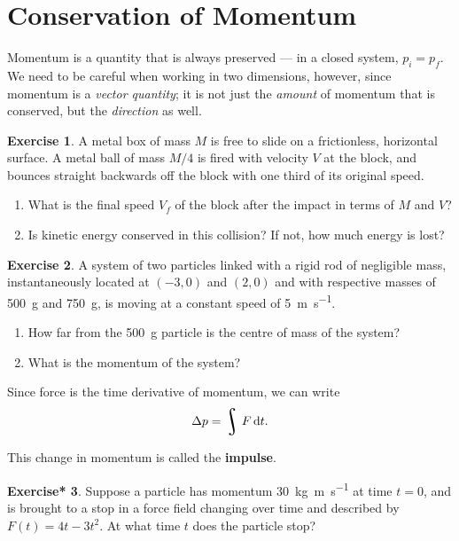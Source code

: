 \documentclass[a4paper]{amsbook}
\theoremstyle{definition}
\newtheorem{exercise}{Exercise}
\numberwithin{exercise}{chapter}
\newtheorem{exercise*}[exercise]{Exercise*}
\numberwithin{exercise}{chapter}
\DeclareMathOperator*{\rint}{\scalerel*{\rotatebox{17}{$\!\int\!$}}{\int}}
\begin{document}
\section{Conservation of Momentum}
Momentum is a quantity that is always preserved --- in a closed system, $ p_i = p_f $. We need to be careful when working in two dimensions,
however, since momentum is a \emph{vector quantity}; it is not just the \emph{amount} of momentum that is conserved, but the \emph{direction}
as well.

\begin{exercise}
  A metal box of mass $ M $ is free to slide on a frictionless, horizontal surface. A metal ball of mass $ M/4 $ is fired with
  velocity $ V $ at the block, and bounces straight backwards off the block with one third of its original speed.
  \begin{enumerate}
    \item What is the final speed $ V_f $ of the block after the impact in terms of $ M $ and $ V $?
    \item Is kinetic energy conserved in this collision? If not, how much energy is lost?
  \end{enumerate}
\end{exercise}

\begin{exercise}
  A system of two particles linked with a rigid rod of negligible mass, instantaneously located at $ (-3,0) $ and $ (2, 0) $ and
  with respective masses of \SI{500}{\gram} and \SI{750}{\gram}, is moving at a constant speed of \SI{5}{\metre\per\second}.
  \begin{enumerate}
    \item How far from the \SI{500}{\gram} particle is the centre of mass of the system?
    \item What is the momentum of the system?
  \end{enumerate}
\end{exercise}

Since force is the time derivative of momentum, we can write
\begin{equation}
  \Delta p = \rint F \dif{t}.
\end{equation}

This change in momentum is called the \textbf{impulse}.

\begin{exercise*}
  Suppose a particle has momentum \SI{30}{\kilo\gram \metre\per\second} at time $ t = 0 $, and is brought to a stop in
  a force field changing over time and described by $ F(t) = 4t - 3t^2 $. At what time $ t $ does the particle stop?
\end{exercise*}
\end{document}
